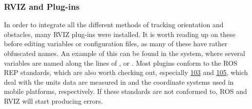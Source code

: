 \subsubsection{RVIZ and Plug-ins}
In order to integrate all the different methods of tracking orientation and obstacles, many RVIZ plug-ins were installed.
It is worth reading up on these before editing variables or configuration files, as many of these have rather obfuscated names.
An example of this can be found in the  system, where several variables are named along the lines of , or .
Most plugins conform to the ROS REP standards, which are also worth checking out, especially \href{https://www.ros.org/reps/rep-0103.html}{103}  and \href{https://www.ros.org/reps/rep-0105.html}{105}, which deal with the units data are measured in and the coordinate systems used in mobile platforms, respectively.
If these standards are not conformed to, ROS and RVIZ will start producing errors.

\newpage